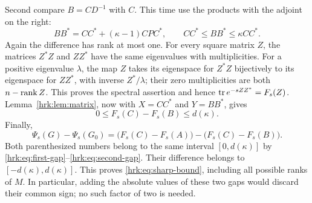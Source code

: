 Second compare $B=CD^{-1}$ with $C$. This time use the products
with the adjoint on the right:
\begin{equation}\label{hrk:eq:right-comparison}
 BB^*=CC^*+(\kappa-1)CPC^*,
 \qquad CC^*\leq BB^*\leq\kappa CC^*.
\end{equation}
Again the difference has rank at most one. For every square matrix
$Z$, the matrices $Z^*Z$ and $ZZ^*$ have the same eigenvalues with
multiplicities. For a positive eigenvalue $\lambda$, the map $Z$
takes its eigenspace for $Z^*Z$ bijectively to its eigenspace for
$ZZ^*$, with inverse $Z^*/\lambda$; their zero multiplicities are
both $n-\operatorname{rank} Z$. This proves the spectral assertion and hence
$\operatorname{tr} e^{-sZZ^*}=F_s(Z)$. Lemma~\ref{hrk:lem:matrix}, now with
$X=CC^*$ and $Y=BB^*$, gives
\begin{equation}\label{hrk:eq:second-gap}
 0\leq F_s(C)-F_s(B)\leq d(\kappa).
\end{equation}
Finally,
\begin{equation}\label{hrk:eq:difference-of-gaps}
 \Psi_s(G)-\Psi_s(G_0)
 =\bigl(F_s(C)-F_s(A)\bigr)
  -\bigl(F_s(C)-F_s(B)\bigr).
\end{equation}
Both parenthesized numbers belong to the same interval
$[0,d(\kappa)]$ by \eqref{hrk:eq:first-gap}--\eqref{hrk:eq:second-gap}.
Their difference belongs to $[-d(\kappa),d(\kappa)]$.
This proves \eqref{hrk:eq:sharp-bound}, including all possible ranks of
$M$. In particular, adding the absolute values of these two gaps
would discard their common sign; no such factor of two is needed.

